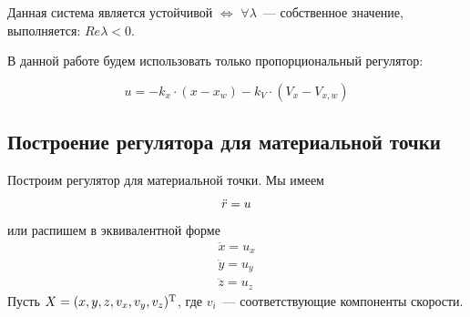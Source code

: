 \documentclass[a4paper,12pt]{article}
\numberwithin{figure}{subsubsection}
\begin{document}
Данная система является устойчивой $\Longleftrightarrow$ $\forall \lambda$~--- собственное значение, выполняется: $Re\lambda < 0$.

В данной работе будем использовать только пропорциональный регулятор:

$$u = -k_x \cdot (x - x_w) - k_V\cdot (V_x - V_{x,w})$$


\subsection{Построение регулятора для материальной точки}

Построим регулятор для материальной точки. Мы имеем
\begin{equation*}
    \Ddot{r} = u
\end{equation*}
или распишем в эквивалентной форме
\begin{align*}
    \ddot{x} = u_x \\
    \ddot{y} = u_y \\
    \ddot{z} = u_z
\end{align*}
Пусть $X = (x,y,z,v_x,v_y,v_z)^\text{\textup{T}}$, где $v_i$~--- соответствующие компоненты скорости.
\end{document}
